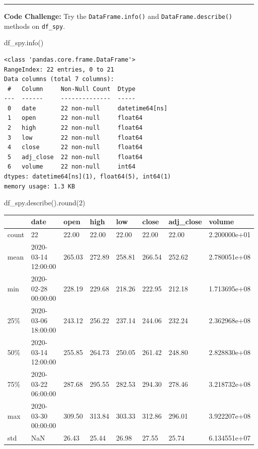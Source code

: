 \documentclass[
  letterpaper,
  DIV=11,
  numbers=noendperiod]{scrreprt}
\newenvironment{Shaded}{\begin{snugshade}}{\end{snugshade}}
\newcommand{\BuiltInTok}[1]{\textcolor[rgb]{0.00,0.23,0.31}{#1}}
\newcommand{\DecValTok}[1]{\textcolor[rgb]{0.68,0.00,0.00}{#1}}
\newcommand{\NormalTok}[1]{\textcolor[rgb]{0.00,0.23,0.31}{#1}}
\begin{document}
\begin{center}\rule{0.5\linewidth}{0.5pt}\end{center}

\textbf{Code Challenge:} Try the \texttt{DataFrame.info()} and
\texttt{DataFrame.describe()} methods on \texttt{df\_spy}.

\begin{Shaded}
\begin{Highlighting}[]
\NormalTok{df\_spy.info()}
\end{Highlighting}
\end{Shaded}

\begin{verbatim}
<class 'pandas.core.frame.DataFrame'>
RangeIndex: 22 entries, 0 to 21
Data columns (total 7 columns):
 #   Column     Non-Null Count  Dtype         
---  ------     --------------  -----         
 0   date       22 non-null     datetime64[ns]
 1   open       22 non-null     float64       
 2   high       22 non-null     float64       
 3   low        22 non-null     float64       
 4   close      22 non-null     float64       
 5   adj_close  22 non-null     float64       
 6   volume     22 non-null     int64         
dtypes: datetime64[ns](1), float64(5), int64(1)
memory usage: 1.3 KB
\end{verbatim}

\begin{Shaded}
\begin{Highlighting}[]
\NormalTok{df\_spy.describe().}\BuiltInTok{round}\NormalTok{(}\DecValTok{2}\NormalTok{)}
\end{Highlighting}
\end{Shaded}

\begin{longtable}[]{@{}llllllll@{}}
\toprule\noalign{}
& date & open & high & low & close & adj\_close & volume \\
\midrule\noalign{}
\endhead
\bottomrule\noalign{}
\endlastfoot
count & 22 & 22.00 & 22.00 & 22.00 & 22.00 & 22.00 & 2.200000e+01 \\
mean & 2020-03-14 12:00:00 & 265.03 & 272.89 & 258.81 & 266.54 & 252.62
& 2.780051e+08 \\
min & 2020-02-28 00:00:00 & 228.19 & 229.68 & 218.26 & 222.95 & 212.18 &
1.713695e+08 \\
25\% & 2020-03-06 18:00:00 & 243.12 & 256.22 & 237.14 & 244.06 & 232.24
& 2.362968e+08 \\
50\% & 2020-03-14 12:00:00 & 255.85 & 264.73 & 250.05 & 261.42 & 248.80
& 2.828830e+08 \\
75\% & 2020-03-22 06:00:00 & 287.68 & 295.55 & 282.53 & 294.30 & 278.46
& 3.218732e+08 \\
max & 2020-03-30 00:00:00 & 309.50 & 313.84 & 303.33 & 312.86 & 296.01 &
3.922207e+08 \\
std & NaN & 26.43 & 25.44 & 26.98 & 27.55 & 25.74 & 6.134551e+07 \\
\end{longtable}
\end{document}

